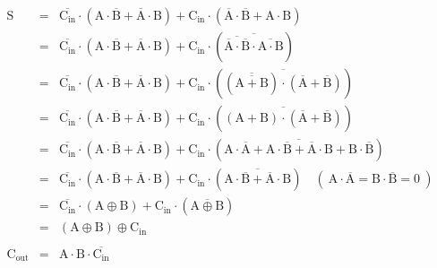 \begin{eqnarray}
	\mathrm{S} 
	&=& \overline{\mathrm{C_{in}}} \cdot (\mathrm{A} \cdot \overline{\mathrm{B}} + \overline{\mathrm{A}} \cdot \mathrm{B} ) 
	+ \mathrm{C_{in}} \cdot (\overline{\mathrm{A}} \cdot \overline{\mathrm{B}} + \mathrm{A} \cdot \mathrm{B} )
	\label{equ_alladd1} \\
	&=& \overline{\mathrm{C_{in}}} \cdot (\mathrm{A} \cdot \overline{\mathrm{B}} + \overline{\mathrm{A}} \cdot \mathrm{B} ) 
	+ \mathrm{C_{in}} \cdot 
	(\overline{\overline{\overline{\mathrm{A}} \cdot \overline{\mathrm{B}}} \cdot \overline{\mathrm{A} \cdot \mathrm{B}}} )
	\label{equ_alladd2} \\
	&=& \overline{\mathrm{C_{in}}} \cdot (\mathrm{A} \cdot \overline{\mathrm{B}} + \overline{\mathrm{A}} \cdot \mathrm{B} ) 
	+ \mathrm{C_{in}} \cdot 
	(\overline{(\overline{\overline{\mathrm{A} + \mathrm{B}}}) \cdot (\overline{\mathrm{A}} + \overline{\mathrm{B}})} )
	\label{equ_alladd3} \\
	&=& \overline{\mathrm{C_{in}}} \cdot (\mathrm{A} \cdot \overline{\mathrm{B}} + \overline{\mathrm{A}} \cdot \mathrm{B} ) 
	+ \mathrm{C_{in}} \cdot 
	(\overline{(\mathrm{A} + \mathrm{B}) 
	\cdot (\overline{\mathrm{A}} + \overline{\mathrm{B}})} )
	\label{equ_alladd4} \\
	&=& \overline{\mathrm{C_{in}}} \cdot (\mathrm{A} \cdot \overline{\mathrm{B}} + \overline{\mathrm{A}} \cdot \mathrm{B} ) 
	+ \mathrm{C_{in}} \cdot 
	(\overline{
	\mathrm{A} \cdot \overline{\mathrm{A}} 
	+ \mathrm{A} \cdot \overline{\mathrm{B}} 
	+ \overline{\mathrm{A}} \cdot \mathrm{B}
	+ \mathrm{B} \cdot \overline{\mathrm{B}} })
	\label{equ_alladd5} \\
	&=& \overline{\mathrm{C_{in}}} \cdot (\mathrm{A} \cdot \overline{\mathrm{B}} + \overline{\mathrm{A}} \cdot \mathrm{B} ) 
	+ \mathrm{C_{in}} \cdot 
	(\overline{
	\mathrm{A} \cdot \overline{\mathrm{B}} 
	+ \overline{\mathrm{A}} \cdot \mathrm{B}}
	)
	\quad 
	\left(~
		\mathrm{A} \cdot \overline{\mathrm{A}} 
		= 
		\mathrm{B} \cdot \overline{\mathrm{B}} 
		=
		0 
	~\right)
	\label{equ_alladd6} \\
	&=& 	\overline{\mathrm{C_{in}}} \cdot (\mathrm{A} \oplus \mathrm{B} ) 
		+ 	\mathrm{C_{in}} \cdot (\overline{\mathrm{A} \oplus \mathrm{B}} )
		\label{equ_alladd7} \\
	&=& 	( \mathrm{A} \oplus \mathrm{B} )\oplus \mathrm{C_{in}} 
		\label{equ_alladd8} \\
	&　&
	\nonumber\\
	\mathrm{C_{out}} 
	&=&		\mathrm{A} \cdot \mathrm{B} \cdot \overline{\mathrm{C_{in}}}

\end{eqnarray}
